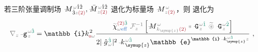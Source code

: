 若三阶张量\textcolor{NavyBlue}{调制场} $\Xint{\mathcolor{gray}{-}}{18}{M}^{\;\! \mathcolor{gray}{\omega} \hat{1} \hat{2} }_{\;\! \hat{3} \mathcolor{gray}{z} \textcolor{Maroon}{(2)} }, \Xint{\mathcolor{gray}{-}}{18}{\bar{M}}^{\;\! \mathcolor{gray}{\omega} \hat{1} \hat{2} }_{\;\! \mathcolor{gray}{z} \textcolor{Maroon}{(2)} }$ 退化为标量\textcolor{NavyBlue}{场} $\Xint{\mathcolor{gray}{-}}{18}{M}^{\;\! \mathcolor{gray}{\omega} }_{\;\! \mathcolor{gray}{z} \textcolor{Maroon}{(2)} }$，则  退化为
\begin{subequations} \label{eq:scalar-g-modulus-P-chieff-scalar}
\begin{align}
	\mathcolor{gray}{\nabla_z} \Xint{\begin{smallmatrix} ~ \\ {}^{}_{\mathcolor{gray}{-}} \\ ~ \end{smallmatrix}}{09}{\mathtt{g}}^{\;\!\mathcolor{gray}{\omega} \textcolor{PineGreen}{\hat{3}}}_{\;\! \mathcolor{gray}{z}} &= \mathbb{i} k_{\textcolor{Maroon}{\mathsf{o}} \mathcolor{gray}{\omega}}^{\;\! 2} \frac{\textcolor{gray}{\widetilde{\textcolor{black}{\chi}}}^{\textcolor{Maroon}{(2)} \textcolor{PineGreen}{\hat{3}}}_{\mathcolor{gray}{\omega} \textcolor{NavyBlue}{\text{eff}}} ~ \mathcolor{gray}{\mathcal F_{z}^{-1}} \left[ \Xint{\mathcolor{gray}{-}}{18}{M}^{\;\! \mathcolor{gray}{\omega} }_{\;\! \mathcolor{gray}{k_{\symup{z}}} \textcolor{Maroon}{(2)} } \mathcolor{gray}{*} \Xint{\mathcolor{gray}{-}}{20}{\mathtt{G}}^{\;\! \mathcolor{gray}{\omega} \textcolor{PineGreen}{\hat{1}}}_{\;\! \mathcolor{gray}{z}} ~\mathcolor{gray}{\widetilde \circledast}~ \Xint{\mathcolor{gray}{-}}{20}{\mathtt{G}}^{\;\! \mathcolor{gray}{\omega} \textcolor{PineGreen}{\hat{2}}}_{\;\! \mathcolor{gray}{z}} \right]}{ 2 \lvert \Xint{{}^{}_{\mathcolor{gray}{-}}}{10}{\hat{g}}^{\;\! \textcolor{PineGreen}{\hat{3}}}_{\;\! \mathcolor{gray}{\omega}} \rvert^2 \Xint{\begin{smallmatrix} ~ \\ {}^{}_{\mathcolor{gray}{-}} \\ ~ \end{smallmatrix}}{15}{k}_{\;\! \symup{z}}^{\;\! \mathcolor{gray}{\omega} \textcolor{PineGreen}{\hat{3}}} \mathbb{e}^{\mathbb{i} \Xint{\begin{smallmatrix} ~ \\ {}^{}_{\mathcolor{gray}{-}} \\ ~ \end{smallmatrix}}{15}{k}_{\symup{z}}^{\;\! \mathcolor{gray}{\omega} \textcolor{PineGreen}{\hat{3}}} \mathcolor{gray}{z}}} ~, \label{eq:scalar-g-modulus-P-chieff-scalar-spectrum} \\

\end{align}
\end{subequations}
